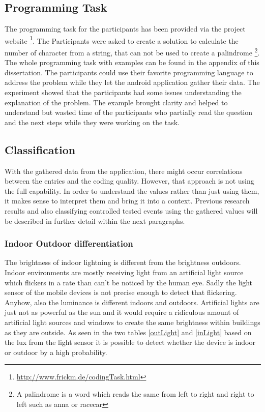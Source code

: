 \subsection{Programming Task}
The programming task for the participants has been provided via the project website \footnote{\url{http://www.frickm.de/codingTask.html}}. 
The Participants were asked to create a solution to calculate the number of character from a string, that can not be used to create a palindrome  \footnote{A palindrome is a word which reads the same from left to right and right to left such as anna or racecar}.
The whole programming task with examples can be found in the appendix of this dissertation. 
The participants could use their favorite programming language to address the problem while they let the android application gather their data. 
\bigbreak
The experiment showed that the participants had some issues understanding the explanation of the problem. The example brought clarity and helped to understand but wasted time of the participants who partially read the question and the next steps while they were working on the task.  

\subsection{Classification}
With the gathered data from the application, there might occur correlations between the entries and the coding quality. However, that approach is not using the full capability. In order to understand the values rather than just using them, it makes sense to interpret them and bring it into a context. Previous research results and also classifying controlled tested events using the gathered values will be described in further detail within the next paragraphs.

\subsubsection{Indoor Outdoor differentiation}
The brightness of indoor lightning is different from the brightness outdoors. Indoor environments are mostly receiving light from an artificial light source which flickers in a rate than can't be noticed by the human eye. Sadly the light sensor of the mobile devices is not precise enough to detect that flickering. Anyhow, also the luminance is different indoors and outdoors. Artificial lights are just not as powerful as the sun and it would require a ridiculous amount of artificial light sources and windows to create the same brightness within buildings as they are outside. 
As seen in the two tables \ref{outLight} and \ref{inLight} based on the lux from the light sensor it is possible to detect whether the device is indoor or outdoor by a high probability.

